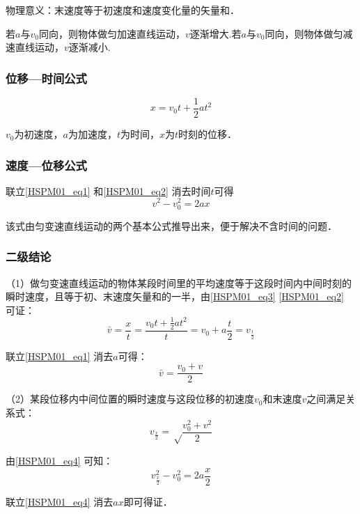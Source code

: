 物理意义：末速度等于初速度和速度变化量的矢量和．

若$a$与$v_0$同向，则物体做匀加速直线运动，$v$逐渐增大.若$a$与$v_0$同向，则物体做匀减速直线运动，$v$逐渐减小.

\subsubsection{位移—时间公式}
\begin{equation}\label{HSPM01_eq2}
x=v_0 t+\frac12at^2
\end{equation}

$v_0$为初速度，$a$为加速度，$t$为时间，$x$为$t$时刻的位移．

\subsubsection{速度—位移公式}
联立\autoref{HSPM01_eq1} 和\autoref{HSPM01_eq2} 消去时间$t$可得
\begin{equation}\label{HSPM01_eq4}
v^2-v_0^2=2ax
\end{equation}

该式由匀变速直线运动的两个基本公式推导出来，便于解决不含时间的问题．

\subsubsection{二级结论}
（1）做匀变速直线运动的物体某段时间里的平均速度等于这段时间内中间时刻的瞬时速度，且等于初、末速度矢量和的一半，由\autoref{HSPM01_eq3} \autoref{HSPM01_eq2} 可证：
\begin{equation}
\bar v=\frac xt=\frac{v_0t+\frac 12at^2}{t}=v_0+a\frac t2=v_{\frac t2}
\end{equation}

联立\autoref{HSPM01_eq1} 消去$a$可得：
\begin{equation}
\bar v=\frac{v_0+v}{2}
\end{equation}

（2）某段位移内中间位置的瞬时速度与这段位移的初速度$v_0$和末速度$v$之间满足关系式：
\begin{equation}
v_\frac x2=\sqrt \frac{v_0^2+v^2}2
\end{equation}

由\autoref{HSPM01_eq4} 可知：
\begin{equation}
v_{\frac x2}^2-v_0^2=2a\frac x2
\end{equation}

联立\autoref{HSPM01_eq4} 消去$ax$即可得证．

